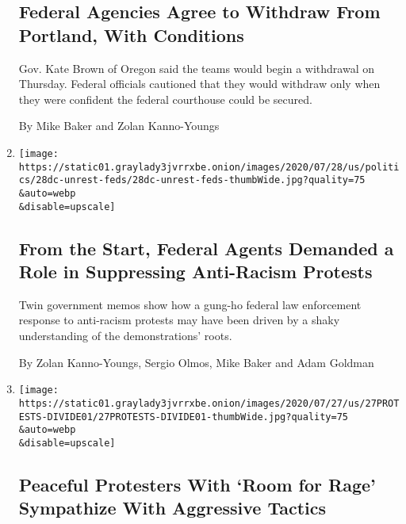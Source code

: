 \begin{enumerate}
  \hypertarget{federal-agencies-agree-to-withdraw-from-portland-with-conditions}{%
  \subsection{Federal Agencies Agree to Withdraw From Portland, With
  Conditions}\label{federal-agencies-agree-to-withdraw-from-portland-with-conditions}}

  Gov. Kate Brown of Oregon said the teams would begin a withdrawal on
  Thursday. Federal officials cautioned that they would withdraw only
  when they were confident the federal courthouse could be secured.

  By Mike Baker and Zolan Kanno-Youngs
\item
  \href{/2020/07/28/us/federal-agents-portland-seattle-protests.html}{}

  \texttt{[image: https://static01.graylady3jvrrxbe.onion/images/2020/07/28/us/politics/28dc-unrest-feds/28dc-unrest-feds-thumbWide.jpg?quality=75\\\&auto=webp\\\&disable=upscale]}

  \hypertarget{from-the-start-federal-agents-demanded-a-role-in-suppressing-anti-racism-protests}{%
  \subsection{From the Start, Federal Agents Demanded a Role in
  Suppressing Anti-Racism
  Protests}\label{from-the-start-federal-agents-demanded-a-role-in-suppressing-anti-racism-protests}}

  Twin government memos show how a gung-ho federal law enforcement
  response to anti-racism protests may have been driven by a shaky
  understanding of the demonstrations' roots.

  By Zolan Kanno-Youngs, Sergio Olmos, Mike Baker and Adam Goldman
\item
  \href{/2020/07/27/us/protests-divisions-blm.html}{}

  \texttt{[image: https://static01.graylady3jvrrxbe.onion/images/2020/07/27/us/27PROTESTS-DIVIDE01/27PROTESTS-DIVIDE01-thumbWide.jpg?quality=75\\\&auto=webp\\\&disable=upscale]}

  \hypertarget{peaceful-protesters-with-room-for-rage-sympathize-with-aggressive-tactics}{%
  \subsection{Peaceful Protesters With `Room for Rage' Sympathize With
  Aggressive
  Tactics}\label{peaceful-protesters-with-room-for-rage-sympathize-with-aggressive-tactics}}


\end{enumerate}
